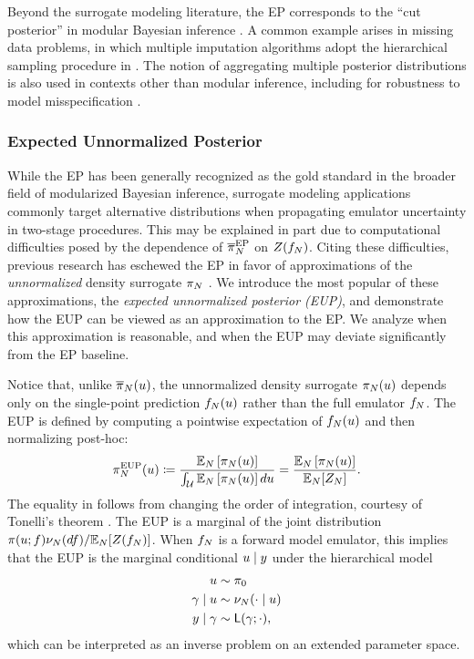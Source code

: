 \documentclass[12pt]{article}
\begin{document}
Beyond the surrogate modeling literature, the EP corresponds to the ``cut posterior'' 
in modular Bayesian inference \citep{PlummerCut}. A common example arises in missing 
data problems, in which multiple imputation algorithms adopt the hierarchical 
sampling procedure in .
The notion of aggregating multiple posterior distributions is also used in contexts other than
modular inference, including for robustness to model misspecification \citep{BayesBag,BayesBag2}.

\subsubsection{Expected Unnormalized Posterior}
 While the EP has been generally recognized as the gold standard 
 in the broader field of modularized Bayesian inference, surrogate 
 modeling applications commonly target alternative distributions when 
 propagating emulator uncertainty in two-stage procedures. This may 
 be explained in part due to computational difficulties posed by 
 the dependence of $\overline{\pi}_{N}^{\mathrm{EP}}$ on $Z(f_{N})$.
Citing these difficulties, previous research has 
eschewed the EP in favor of approximations of the \textit{unnormalized}
density surrogate $\pi_{N}$ \citep{StuartTeck1,StuartTeck2,VehtariParallelGP}.
We introduce the most popular of these approximations, the 
\textit{expected unnormalized posterior (EUP)}, and demonstrate 
how the EUP can be viewed as an approximation to the EP. We analyze when 
this approximation is reasonable, and when the EUP may deviate significantly 
from the EP baseline.

Notice that, unlike $\overline{\pi}_{N}(u)$, the unnormalized density surrogate
$\pi_{N}(u)$ depends only on the single-point prediction $f_{N}(u)$
rather than the full emulator $f_{N}$. The EUP is defined by computing
a pointwise expectation of $f_{N}(u)$ and then normalizing post-hoc:
\begin{equation}
\pi_{N}^{\mathrm{EUP}}(u) \coloneqq 
\frac{\mathbb{E}_{N}\left[\pi_{N}(u) \right]}{\int_{\mathcal{U}} \mathbb{E}_{N}\left[\pi_{N}(u) \right] du}
= \frac{\mathbb{E}_{N}\left[\pi_{N}(u) \right]}{\mathbb{E}_{N}[Z_{N}]}. \label{eq:post-approx-EL} 
\end{equation}
The equality in  follows from
changing the order of integration, courtesy of Tonelli's theorem \citep{StuartTeck1}. The EUP
is a marginal of the joint distribution 
$\pi(u; f) \nu_{N}(df) / \mathbb{E}_{N}[Z(f_{N})]$. 
When $f_{N}$ is a forward model emulator, this implies that the EUP is the 
marginal conditional $u \mid y$ under the hierarchical model 
\begin{align}
u &\sim \pi_0 \label{eq:el-prob-model} \\
\gamma \mid u &\sim \nu_{N}(\cdot \mid u) \nonumber \\
y \mid \gamma &\sim \mathsf{L}(\gamma; \cdot), \nonumber
\end{align}
which can be interpreted as an inverse problem on an extended parameter space.
\end{document}
